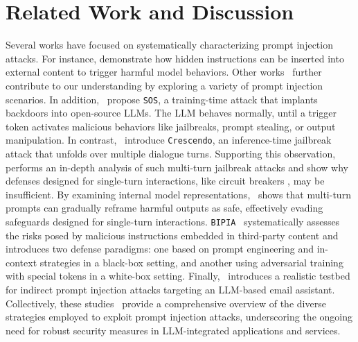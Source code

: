 \section{Related Work and Discussion}

Several works have focused on systematically characterizing prompt injection attacks.
For instance, \cite{greshake2023not} demonstrate how hidden instructions can be inserted into external content to trigger harmful model behaviors.
Other works~\cite{wei2023jailbroken, zou2023universaltransferableadversarialattacks, zhang2024effective, deng2023masterkey, huang2024catastrophic, liu2024autodan, shen2024doanything, deng2024multilingual, chao2025jailbreaking} further contribute to our understanding by exploring a variety of prompt injection scenarios.
In addition,~\cite{Yang2024SOS} propose \texttt{SOS}, a training-time  attack that implants backdoors into open-source LLMs. The LLM behaves normally, until a trigger token activates malicious behaviors like jailbreaks, prompt stealing, or output manipulation.
In contrast,~\cite{russinovich2025greatwritearticlethat} introduce \texttt{Crescendo}, an inference-time jailbreak attack that unfolds over multiple dialogue turns.
Supporting this observation,~\cite{bullwinkel2025representation} performs an in-depth analysis of such multi-turn jailbreak attacks and show why defenses designed for single-turn interactions, like circuit breakers \cite{zou2024improving}, may be insufficient.
By examining internal model representations,~\cite{bullwinkel2025representation} shows that multi-turn prompts can gradually reframe harmful outputs as safe, effectively evading safeguards designed for single-turn interactions.
\texttt{BIPIA}~\cite{yi2025benchmarking} systematically assesses the risks posed by malicious instructions embedded in third-party content and introduces two defense paradigms: one based on prompt engineering and in-context strategies in a black-box setting, and another using adversarial training with special tokens in a white-box setting.
Finally,~\cite{abdelnabi2025llmail} introduces a realistic testbed for indirect prompt injection attacks targeting an LLM-based email assistant.
Collectively, these studies~\cite{greshake2023not, wei2023jailbroken, zou2023universaltransferableadversarialattacks, zhang2024effective, deng2023masterkey, huang2024catastrophic, liu2024autodan, shen2024doanything, deng2024multilingual, chao2025jailbreaking, Yang2024SOS, russinovich2025greatwritearticlethat, bullwinkel2025representation, yi2025benchmarking, abdelnabi2025llmail} provide a comprehensive overview of the diverse strategies employed to exploit prompt injection attacks, underscoring the ongoing need for robust security measures in LLM-integrated applications and services.


